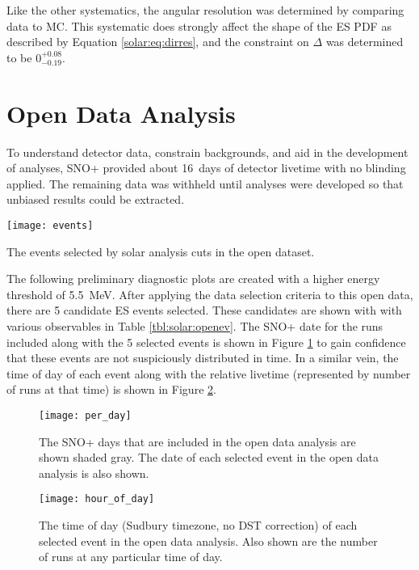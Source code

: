 Like the other systematics, the angular resolution was determined by comparing \N data to MC. 
This systematic does strongly affect the shape of the ES PDF as described by Equation \ref{solar:eq:dirres}, and the constraint on $\Delta$ was determined to be $0^{+0.08}_{-0.19}$.

\section{Open Data Analysis}
\label{sec:solar:opendata}

To understand detector data, constrain backgrounds, and aid in the development of analyses, SNO+ provided about 16~days of detector livetime with no blinding applied.
The remaining data was withheld until analyses were developed so that unbiased results could be extracted.

\begin{table}
\centering
\texttt{[image: events]}
\caption{The events selected by solar analysis cuts in the open dataset.}
\label{tbl:solar:openev}
\end{table}

The following preliminary diagnostic plots are created with a higher energy threshold of 5.5~MeV.
After applying the data selection criteria to this open data, there are 5 candidate ES events selected.
These candidates are shown with with various observables in Table \ref{tbl:solar:openev}.
The SNO+ date for the runs included along with the 5 selected events is shown in Figure \ref{fig:solar:opendata} to gain confidence that these events are not suspiciously distributed in time.
In a similar vein, the time of day of each event along with the relative livetime (represented by number of runs at that time) is shown in Figure \ref{fig:solar:tod}.

\begin{figure}
\centering
\texttt{[image: per\_day]}
\caption{The SNO+ days that are included in the open data analysis are shown
         shaded gray.
         The date of each selected event in the open data analysis is also shown.}
\label{fig:solar:opendata}
\end{figure}


\begin{figure}
\centering
\texttt{[image: hour\_of\_day]}
\caption{The time of day (Sudbury timezone, no DST correction) of each selected
         event in the open data analysis.
         Also shown are the number of runs at any particular time of day.}
\label{fig:solar:tod}
\end{figure}


